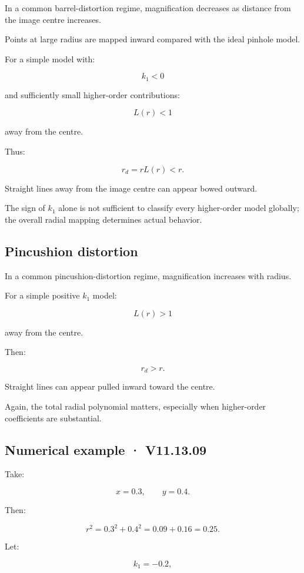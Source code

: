 In a common barrel-distortion regime, magnification decreases as distance from the image centre increases.

Points at large radius are mapped inward compared with the ideal pinhole model.

For a simple model with:

\[
 k_1<0
\]

and sufficiently small higher-order contributions:

\[
 L(r)<1
\]

away from the centre.

Thus:

\[
 r_d=rL(r)<r.
\]

Straight lines away from the image centre can appear bowed outward.

The sign of \(k_1\) alone is not sufficient to classify every higher-order model globally; the overall radial mapping determines actual behavior.

\subsection{Pincushion distortion}\label{02-foundations-ii-ch035-pincushion-distortion}

In a common pincushion-distortion regime, magnification increases with radius.

For a simple positive \(k_1\) model:

\[
 L(r)>1
\]

away from the centre.

Then:

\[
 r_d>r.
\]

Straight lines can appear pulled inward toward the centre.

Again, the total radial polynomial matters, especially when higher-order coefficients are substantial.

\subsection{Numerical example · V11.13.09}\label{02-foundations-ii-ch035-numerical-example-v11.13.09}

Take:

\[
 x=0.3,\qquad y=0.4.
\]

Then:

\[
 r^2=0.3^2+0.4^2 =0.09+0.16 =\boxed{0.25}.
\]

Let:

\[
 k_1=-0.2,
\]

